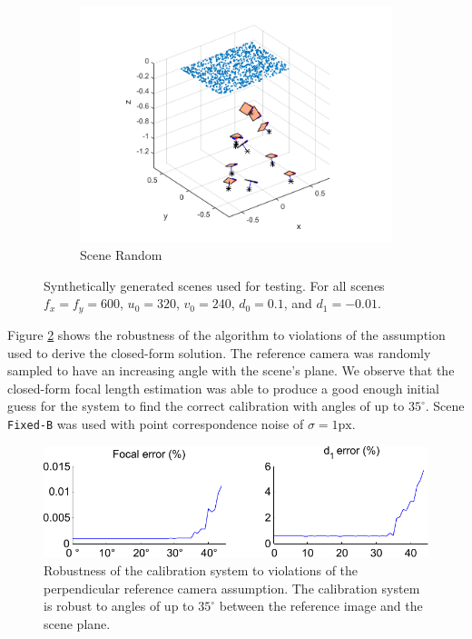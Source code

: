 \documentclass[10pt,twocolumn,letterpaper]{article}
\begin{document}
\begin{figure}
\begin{subfigure}[b]{0.32\linewidth}
\includegraphics[width=\linewidth]{images/synthCameraPosesRandom.pdf}
	\caption{Scene Random}
\end{subfigure}
\caption{Synthetically generated scenes used for testing. For all scenes $f_x=f_y=600$, $u_0=320$, $v_0=240$, $d_0=0.1$, and $d_1=-0.01$.}
\label{fig:synth_poses}
\end{figure}

Figure \ref{fig:results_normal_angle} shows the robustness of the algorithm to violations of the assumption used to derive the closed-form solution. The reference camera was randomly sampled to have an increasing angle with the scene's plane. We observe that the closed-form focal length estimation was able to produce a good enough initial guess for the system to find the correct calibration with angles of up to $35^\circ$.  Scene \texttt{Fixed-B} was used with point correspondence noise of $\sigma=1\text{px}$.

\begin{figure}
\centering
\includegraphics[width=\linewidth]{images/resultsNormalAngle.pdf}
\caption{Robustness of the calibration system to violations of the perpendicular reference camera assumption. The calibration system is robust to angles of up to $35^\circ$ between the reference image and the scene plane.}
\label{fig:results_normal_angle}
\end{figure}
\end{document}
